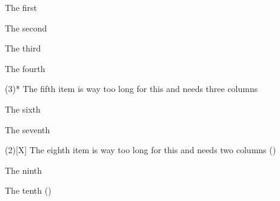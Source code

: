 \documentclass{article}
\begin{document}
\begin{enumext*}[widest=10,columns=4]
\item The first
\item* The second
\item The third
\item The fourth
\item(3)* The fifth item is way too long for this and needs three columns
\item The sixth
\item The seventh
\item(2)[X] The eighth item is way too long for this and needs two columns
  (\the\itemwidth)
\item The ninth
\item[Z] The tenth (\the\itemwidth)
\end{enumext*}
\end{document}

